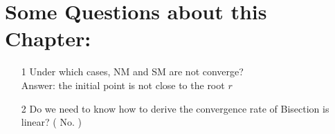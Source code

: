 \documentclass [9 pt]{article}
\theoremstyle{definition}
\begin{document}
\bigskip
\section*{Some Questions about this Chapter:}
\begin{itemize}
	\item[1] Under which cases, NM and SM are not converge?\\
	Answer: the initial point is not close to the root $r$
	\item[2] Do we need to know how to derive the convergence rate of Bisection is linear?
	(  No. )
\end{itemize}



	
\end{document}
